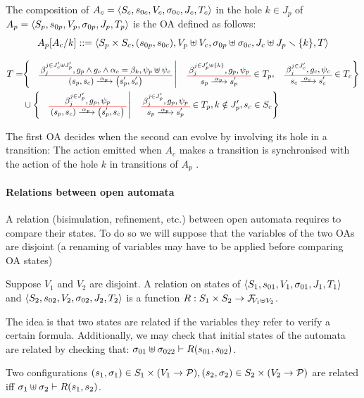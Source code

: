\documentclass[runningheads]{llncs}
\begin{document}
\begin{definition} \label{Def:CompOA}
The composition of \(A_c = \OAg[c]\) in the hole \(k \in J_p\) of \(A_p = \OAg[p]\) is the OA defined as follows:
\[A_p\subst{A_c}{k} ::=  \OA{S_p \times S_c}{\mpar{s_{0p}, s_{0c}}}{V_p \uplus V_c}{\sigma_{0p} \uplus \sigma_{0c}}{J_c \uplus J_p \setminus \mbrc{k}}{T} \] 

\begin{align*}
T=& \mset{\OT{\mpar{s_p, s_c}}{\mpar{s'_p, s'_c}}{\alpha_p}{\beta_j^{j \in J'_c \uplus J'_p}}{g_p \wedge g_c \wedge \alpha_c = \beta_k}{\psi_p \uplus \psi_c}}{ \OT{s_p}{s'_p}{\alpha_p}{\beta_j^{j \in J'_p \uplus \mbrc{k} }}{g_p}{\psi_p} \in T_p, \OTx{c}{}{}{c} \in T_c} \\
	& \cup \mset{\OT{\mpar{s_p, s_c}}{\mpar{s'_p, s_c}}{\alpha_p}{\beta_j^{j \in J'_p}}{g_p}{\psi_p}}{\OTx{p}{}{}{p} \in T_p, k \notin J'_p, s_c \in S_c}
\end{align*}
\end{definition}
The first OA decides when the second can evolve by involving its hole in a transition:
The action emitted when \(A_c\) makes a transition is synchronised with the action of the hole \(k\) in transitions of \(A_p\) .

\paragraph{Relations between open automata}
A relation (bisimulation, refinement, etc.) between open automata requires to compare their states. To do so we will suppose that the variables of the two OAs are disjoint (a renaming of variables may have to be applied before comparing OA states)
\begin{definition} Suppose $V_1$ and $V_2$ are disjoint.
A relation on states of \(\OAg[1]\) and \(\OAg[2]\) is a function \(R: S_1 \times S_2 \to \rformulas[V_1 \uplus V_2]\).
\end{definition}
The idea is that two states are related if the variables they refer to verify a certain formula. Additionally, we may check that initial states of the automata are related by checking that: \(\sigma_{01} \uplus \sigma_{022} \vdash R\mpar{s_{01}, s_{02}}\).

Two configurations \(\mpar{s_1, \sigma_1} \in S_1 \times\mpar{V_1 \to \values}, \mpar{s_2, \sigma_2} \in S_2 \times \mpar{V_2 \to \values}\) are related iff \(\sigma_1 \uplus \sigma_2 \vdash R\mpar{s_1, s_2}\).
\end{document}
